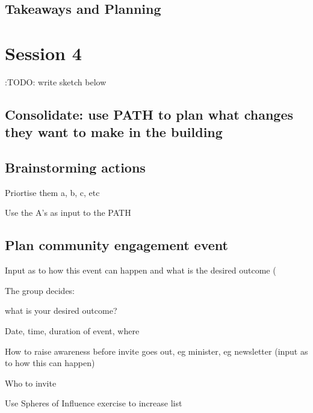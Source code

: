 \documentclass[letterpaper,10pt,english]{jupyterBook}
\begin{document}
\sphinxstepscope


\section{Takeaways and Planning}
\label{\detokenize{session3/details/takeaways-and-planning:takeaways-and-planning}}\label{\detokenize{session3/details/takeaways-and-planning::doc}}
\sphinxstepscope


\chapter{Session 4}
\label{\detokenize{session4/session4:session-4}}\label{\detokenize{session4/session4::doc}}
\sphinxAtStartPar
:TODO: write \sphinxhyphen{} sketch below


\section{Consolidate:  use PATH to plan what changes they want to make in the building}
\label{\detokenize{session4/session4:consolidate-use-path-to-plan-what-changes-they-want-to-make-in-the-building}}

\section{Brainstorming actions}
\label{\detokenize{session4/session4:brainstorming-actions}}
\sphinxAtStartPar
Priortise them a, b, c, etc

\sphinxAtStartPar
Use the A’s as input to the PATH


\section{Plan community engagement event}
\label{\detokenize{session4/session4:plan-community-engagement-event}}
\sphinxAtStartPar
Input as to how this event can happen and what is the desired outcome (

\sphinxAtStartPar
The group decides:

\sphinxAtStartPar
what is your desired outcome?

\sphinxAtStartPar
Date, time, duration of event, where

\sphinxAtStartPar
How to raise awareness before invite goes out, eg minister, eg newsletter (input as to how this can happen)

\sphinxAtStartPar
Who to invite

\sphinxAtStartPar
Use Spheres of Influence exercise to increase list
\end{document}
